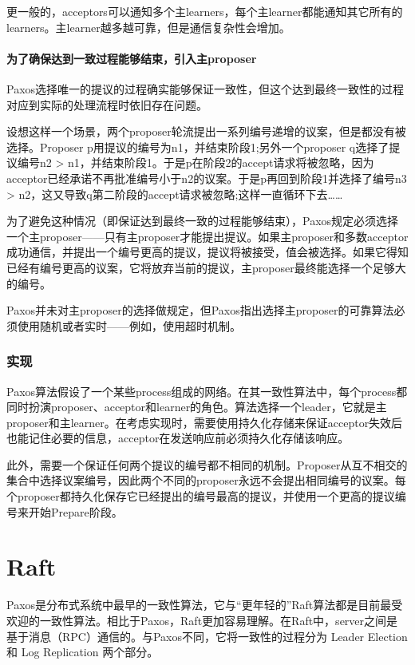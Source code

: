 \documentclass[UTF8]{article}
\begin{document}
更一般的，acceptors可以通知多个主learners，每个主learner都能通知其它所有的learners。主learner越多越可靠，但是通信复杂性会增加。

\paragraph{为了确保达到一致过程能够结束，引入主proposer}
Paxos选择唯一的提议的过程确实能够保证一致性，但这个达到最终一致性的过程对应到实际的处理流程时依旧存在问题。

设想这样一个场景，两个proposer轮流提出一系列编号递增的议案，但是都没有被选择。Proposer p用提议的编号为n1，并结束阶段1;另外一个proposer q选择了提议编号n2 > n1，并结束阶段1。于是p在阶段2的accept请求将被忽略，因为acceptor已经承诺不再批准编号小于n2的议案。于是p再回到阶段1并选择了编号n3 > n2，这又导致q第二阶段的accept请求被忽略;这样一直循环下去……

为了避免这种情况（即保证达到最终一致的过程能够结束），Paxos规定必须选择一个主proposer——只有主proposer才能提出提议。如果主proposer和多数acceptor成功通信，并提出一个编号更高的提议，提议将被接受，值会被选择。如果它得知已经有编号更高的议案，它将放弃当前的提议，主proposer最终能选择一个足够大的编号。

Paxos并未对主proposer的选择做规定，但Paxos指出选择主proposer的可靠算法必须使用随机或者实时——例如，使用超时机制。

\subsubsection{实现}

Paxos算法假设了一个某些process组成的网络。在其一致性算法中，每个process都同时扮演proposer、acceptor和learner的角色。算法选择一个leader，它就是主proposer和主learner。在考虑实现时，需要使用持久化存储来保证acceptor失效后也能记住必要的信息，acceptor在发送响应前必须持久化存储该响应。

此外，需要一个保证任何两个提议的编号都不相同的机制。Proposer从互不相交的集合中选择议案编号，因此两个不同的proposer永远不会提出相同编号的议案。每个proposer都持久化保存它已经提出的编号最高的提议，并使用一个更高的提议编号来开始Prepare阶段。


\section{Raft}

Paxos是分布式系统中最早的一致性算法，它与“更年轻的”Raft算法都是目前最受欢迎的一致性算法。相比于Paxos，Raft更加容易理解。在Raft中，server之间是基于消息（RPC）通信的。与Paxos不同，它将一致性的过程分为 Leader Election 和 Log Replication 两个部分。
\end{document}
